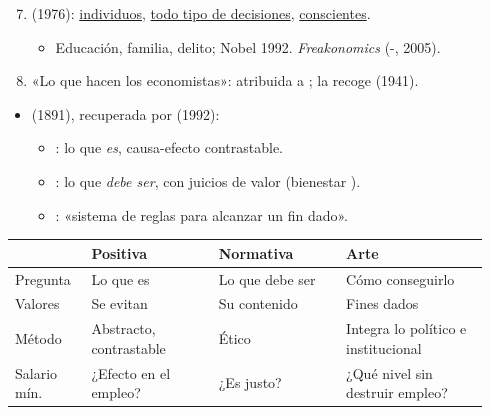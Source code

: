 \documentclass{article}
\begin{document}
\begin{columnas}
\begin{enumerate}
\end{enumerate}
\begin{enumerate}\setcounter{enumi}{6}
\item {} (1976): \uline{individuos}, \uline{todo tipo de decisiones}, \uline{conscientes}.
  \begin{itemize}
  \item Educación, familia, delito; Nobel 1992. \emph{Freakonomics} (-, 2005).
  \end{itemize}
\item «Lo que hacen los economistas»: atribuida a ; la recoge  (1941).
\end{enumerate}

\begin{itemize}
\item {} (1891), recuperada por  (1992):
  \begin{itemize}
  \item {}: lo que \emph{es}, causa-efecto contrastable.
  \item {}: lo que \emph{debe ser}, con juicios de valor (bienestar ).
  \item {}: «sistema de reglas para alcanzar un fin dado».
  \end{itemize}
\end{itemize}
\begin{center}\footnotesize\setlength{\tabcolsep}{2.5pt}
\begin{tabular}{@{}>{\raggedright\arraybackslash}p{0.15\linewidth}>{\raggedright\arraybackslash}p{0.25\linewidth}>{\raggedright\arraybackslash}p{0.25\linewidth}>{\raggedright\arraybackslash}p{0.29\linewidth}@{}}
\toprule
 & \textbf{Positiva} & \textbf{Normativa} & \textbf{Arte}\\
\midrule
Pregunta & Lo que es & Lo que debe ser & Cómo conseguirlo\\
Valores & Se evitan & Su contenido & Fines dados\\
Método & Abstracto, contrastable & Ético & Integra lo político e institucional\\
Salario mín. & ¿Efecto en el empleo? & ¿Es justo? & ¿Qué nivel sin destruir empleo?\\
\bottomrule
\end{tabular}

\end{center}
\end{columnas}
\end{document}
